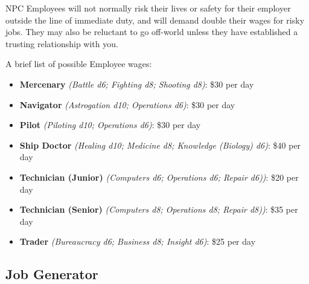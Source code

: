 \begin{multicols}{2}
  NPC Employees will not normally risk their lives or safety for their employer outside the line of immediate duty, and will demand double their wages for risky jobs. They may also be reluctant to go off-world unless they have established a trusting relationship with you.
  
  A brief list of possible Employee wages:
  
  \begin{itemize}
    \item \textbf{Mercenary} \textit{(Battle d6; Fighting d8; Shooting d8)}: \$30 per day
    \item \textbf{Navigator} \textit{(Astrogation d10; Operations d6)}: \$30 per day
    \item \textbf{Pilot} \textit{(Piloting d10; Operations d6)}: \$30 per day
    \item \textbf{Ship Doctor} \textit{(Healing d10; Medicine d8; Knowledge (Biology) d6)}: \$40 per day
    \item \textbf{Technician (Junior)} \textit{(Computers d6; Operations d6; Repair d6))}: \$20 per day
    \item \textbf{Technician (Senior)} \textit{(Computers d8; Operations d8; Repair d8))}: \$35 per day
    \item \textbf{Trader} \textit{(Bureaucracy d6; Business d8; Insight d6)}: \$25 per day
  \end{itemize}

  

\end{multicols}

\subsection{Job Generator}

